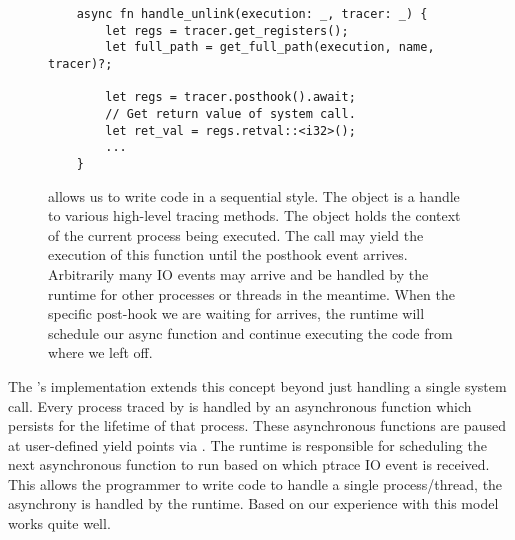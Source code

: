 \begin{figure}[hbtp]
    \begin{lstlisting}
    async fn handle_unlink(execution: _, tracer: _) {
        let regs = tracer.get_registers();
        let full_path = get_full_path(execution, name, tracer)?;
        
        let regs = tracer.posthook().await;
        // Get return value of system call.
        let ret_val = regs.retval::<i32>();
        ...
    }
    \end{lstlisting}
    \caption{ allows us to write code in a sequential style. The  object is a handle to various high-level tracing methods. The  object holds the context of the current process being executed. The  call may yield the execution of this function until the posthook event arrives. Arbitrarily many IO events may arrive and be handled by the  runtime for other processes or threads in the meantime. When the specific post-hook we are waiting for arrives, the runtime will schedule our async function and continue executing the code from where we left off.}
    \label{fig:asyncExample}

\end{figure}

The 's implementation extends this concept beyond just handling a single system call. Every process traced by \pc is handled by an asynchronous function which persists for the lifetime of that process. These asynchronous functions are paused at user-defined yield points via . The runtime is responsible for scheduling the next asynchronous function to run based on which ptrace IO event is received. This allows the programmer to write code to handle a single process/thread, the asynchrony is handled by the runtime. Based on our experience with \pc this model works quite well.